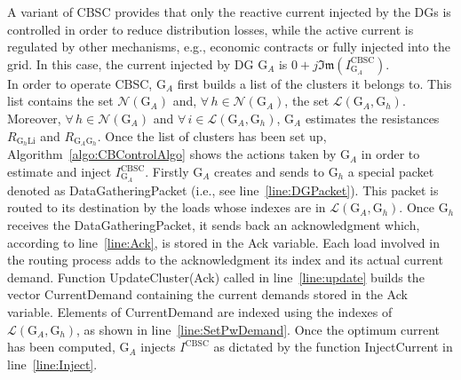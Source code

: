 \documentclass[journal]{IEEEtran}
\begin{document}
A variant of CBSC provides that only the reactive current injected by the DGs is controlled in order to reduce distribution losses, while the active current is regulated by other mechanisms, e.g., economic contracts or fully injected into the grid. In this case, the current injected by DG $\text{G}_A$ is $\displaystyle0+j\mathfrak{Im}(I^{\text{CBSC}}_{\text{G}_A})$.\\
In order to operate CBSC, $\text{G}_A$ first builds a list of the clusters it belongs to. This list contains the set $\mathcal N(\text{G}_A)$ and, \mbox{$\forall \, h \in \mathcal N(\text{G}_A)$}, the set $\mathcal{L}(\text{G}_A,\text{G}_h)$. Moreover, $\forall \, h\in \mathcal N(\text{G}_A)$ and $\forall \, i\in\mathcal{L}(\text{G}_A,\text{G}_h)$, $\text{G}_A$ estimates the resistances $R_{\text{G}_h\text{Li}}$ and $R_{\text{G}_A\text{G}_h}$. Once the list of clusters has been set up, Algorithm~\ref{algo:CBControlAlgo} shows the actions taken by $\text{G}_A$ in order to estimate and inject $I_{\text{G}_A}^{\text{CBSC}}$. Firstly $\text{G}_A$ creates and sends to $\text{G}_h$ a special packet denoted as DataGatheringPacket (i.e., see line~\ref{line:DGPacket}). This packet is routed to its destination by the loads whose indexes are in $\mathcal{L}(\text{G}_A,\text{G}_h)$. Once $\text{G}_h$ receives the DataGatheringPacket, it sends back an acknowledgment which, according to line~\ref{line:Ack}, is stored in the Ack variable. Each load involved in the routing process adds to the acknowledgment its index and its actual current demand. Function UpdateCluster(Ack) called in line~\ref{line:update} builds the vector CurrentDemand containing the current demands stored in the Ack variable. Elements of CurrentDemand are indexed using the indexes of $\mathcal{L}(\text{G}_A,\text{G}_h)$, as shown in line~\ref{line:SetPwDemand}. Once the optimum current has been computed, $\text{G}_A$ injects $I^{\text{CBSC}}$ as dictated by the function InjectCurrent in line~\ref{line:Inject}.
\end{document}
